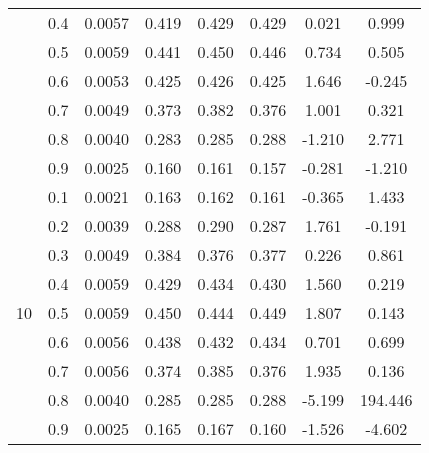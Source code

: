 \documentclass[11pt,a4paper]{report}
\begin{document}
\begin{longtable}{ | c | c || c | c | c | c | c | c | }
 & 0.4 & 0.0057 & 0.419 & 0.429 & 0.429 & 0.021 & 0.999 \\
 & 0.5 & 0.0059 & 0.441 & 0.450 & 0.446 & 0.734 & 0.505 \\
 & 0.6 & 0.0053 & 0.425 & 0.426 & 0.425 & 1.646 & -0.245 \\
 & 0.7 & 0.0049 & 0.373 & 0.382 & 0.376 & 1.001 & 0.321 \\
 & 0.8 & 0.0040 & 0.283 & 0.285 & 0.288 & -1.210 & 2.771 \\
 & 0.9 & 0.0025 & 0.160 & 0.161 & 0.157 & -0.281 & -1.210 \\
 \hline
\multirow{9}{*}{10} & 0.1 & 0.0021 & 0.163 & 0.162 & 0.161 & -0.365 & 1.433 \\
 & 0.2 & 0.0039 & 0.288 & 0.290 & 0.287 & 1.761 & -0.191 \\
 & 0.3 & 0.0049 & 0.384 & 0.376 & 0.377 & 0.226 & 0.861 \\
 & 0.4 & 0.0059 & 0.429 & 0.434 & 0.430 & 1.560 & 0.219 \\
 & 0.5 & 0.0059 & 0.450 & 0.444 & 0.449 & 1.807 & 0.143 \\
 & 0.6 & 0.0056 & 0.438 & 0.432 & 0.434 & 0.701 & 0.699 \\
 & 0.7 & 0.0056 & 0.374 & 0.385 & 0.376 & 1.935 & 0.136 \\
 & 0.8 & 0.0040 & 0.285 & 0.285 & 0.288 & -5.199 & 194.446 \\
 & 0.9 & 0.0025 & 0.165 & 0.167 & 0.160 & -1.526 & -4.602 \\
 \hline
\hline
\end{longtable}
\end{document}
